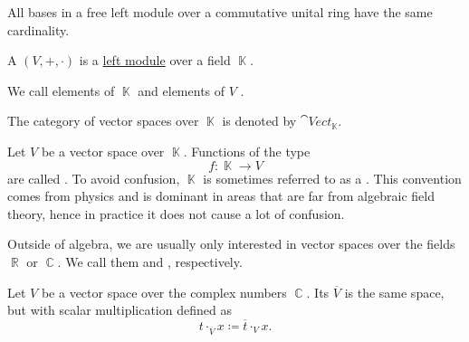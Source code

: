 \begin{proposition}\label{thm:left_module_basis_cardinality}
  All bases in a free left module over a commutative unital ring have the same cardinality.
\end{proposition}
\begin{definition}\label{def:vector_space}
  A  \( (V, +, \cdot) \) is a \hyperref[def:module]{left module} over a field \( \BbbK \).

  We call elements of \( \BbbK \)  and elements of \( V \) .

  The category of vector spaces over \( \BbbK \) is denoted by \( \cat{Vect}_{\BbbK} \).
\end{definition}

\begin{definition}\label{def:vector_field}
  Let \( V \) be a vector space over \( \BbbK \). Functions of the type
  \begin{equation*}
    f: \BbbK \to V
  \end{equation*}
  are called . To avoid confusion, \( \BbbK \) is sometimes referred to as a . This convention comes from physics and is dominant in areas that are far from algebraic field theory, hence in practice it does not cause a lot of confusion.
\end{definition}

\begin{remark}\label{rem:real_vector_space}
  Outside of algebra, we are usually only interested in vector spaces over the fields \( \BbbR \) or \( \BbbC \). We call them  and , respectively.
\end{remark}

\begin{definition}\label{def:complex_conjucate_vector_space}
  Let \( V \) be a vector space over the complex numbers \( \BbbC \). Its  \( \overline V \) is the same space, but with scalar multiplication defined as
  \begin{equation*}
    t \cdot_{\overline V} x \coloneqq \overline t \cdot_V x.
  \end{equation*}
\end{definition}

